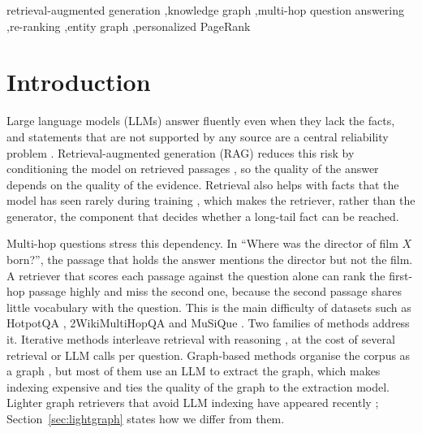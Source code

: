 \documentclass[a4paper,fleqn]{cas-sc}
\begin{document}
\begin{keywords}
retrieval-augmented generation \sep knowledge graph \sep multi-hop question answering \sep re-ranking \sep entity graph \sep personalized PageRank
\end{keywords}

\maketitle

\section{Introduction}\label{sec:intro}
Large language models (LLMs) answer fluently even when they lack the facts, and statements that are not supported by any source are a central reliability problem \citep{ji2023hallucination,huang2023hallsurvey}. Retrieval-augmented generation (RAG) reduces this risk by conditioning the model on retrieved passages \citep{lewis2020rag,guu2020realm,izacard2021fid,gao2023ragsurvey}, so the quality of the answer depends on the quality of the evidence. Retrieval also helps with facts that the model has seen rarely during training \citep{mallen2023trust}, which makes the retriever, rather than the generator, the component that decides whether a long-tail fact can be reached.

Multi-hop questions stress this dependency. In ``Where was the director of film $X$ born?'', the passage that holds the answer mentions the director but not the film. A retriever that scores each passage against the question alone can rank the first-hop passage highly and miss the second one, because the second passage shares little vocabulary with the question. This is the main difficulty of datasets such as HotpotQA \citep{yang2018hotpotqa}, 2WikiMultiHopQA \citep{ho2020twowiki} and MuSiQue \citep{trivedi2022musique}. Two families of methods address it. Iterative methods interleave retrieval with reasoning \citep{trivedi2023ircot,qi2019golden,xiong2021mdr,jiang2023flare}, at the cost of several retrieval or LLM calls per question. Graph-based methods organise the corpus as a graph \citep{edge2024graphrag,guo2024lightrag,gutierrez2024hipporag,sarthi2024raptor}, but most of them use an LLM to extract the graph, which makes indexing expensive and ties the quality of the graph to the extraction model. Lighter graph retrievers that avoid LLM indexing have appeared recently \citep{zhuang2025linearrag,wang2026sprig,melo2025griever}; Section~\ref{sec:lightgraph} states how we differ from them.
\end{document}
